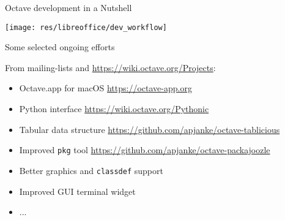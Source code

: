 \begin{frame}{Octave development in a Nutshell}
\begin{center}
\texttt{[image: res/libreoffice/dev\_workflow]}
\end{center}
\end{frame}

\begin{frame}{Some selected ongoing efforts}

From mailing-lists
and {\color{DarkBlue}\url{https://wiki.octave.org/Projects}}:\\[1em]
\begin{itemize}
\itemsep1em
\item
Octave.app for macOS
\hfill{\scriptsize\color{DarkBlue} \url{https://octave-app.org}}
\item
Python interface
\hfill{\scriptsize\color{DarkBlue} \url{https://wiki.octave.org/Pythonic}}
\item
Tabular data structure
\hfill{\scriptsize\color{DarkBlue}
\url{https://github.com/apjanke/octave-tablicious}}
\item
Improved \texttt{pkg} tool
\hfill{\scriptsize\color{DarkBlue}
\url{https://github.com/apjanke/octave-packajoozle}}
\item
Better graphics and \texttt{classdef} support
\item
Improved GUI terminal widget
\item
...
\end{itemize}
\end{frame}